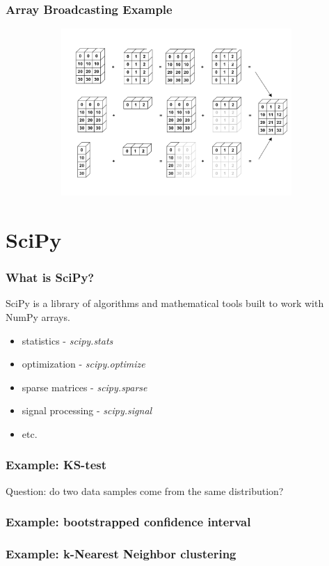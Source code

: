 \documentclass{beamer}
\begin{document}
\begin{frame}
\frametitle{Array Broadcasting Example}
\begin{figure}
    \centering
	\begin{subfigure}[b]{\textwidth}
	\centering
	\includegraphics[height=2.5in]{broadcasting}
	\label{fig:xkcd}
	\end{subfigure}
\end{figure}
\end{frame}



\section{SciPy}

\begin{frame}
\frametitle{What is SciPy?}
SciPy is a library of algorithms and mathematical tools built to work with NumPy arrays.
\vspace{0.2in}
\begin{itemize}
\setlength{\itemsep}{0.1in}
\item{statistics - \textit{scipy.stats}}
\item{optimization - \textit{scipy.optimize}}
\item{sparse matrices - \textit{scipy.sparse}}
\item{signal processing - \textit{scipy.signal}}
\item{etc.}
\end{itemize}
\end{frame}


\begin{frame}
\frametitle{Example: KS-test}
Question: do two data samples come from the same distribution?
\lstset{basicstyle=\scriptsize}
\end{frame}

\begin{frame}
\lstset{basicstyle=\scriptsize}
\frametitle{Example: bootstrapped confidence interval}
\end{frame}

\begin{frame}
\frametitle{Example: k-Nearest Neighbor clustering}
\end{frame}
\end{document}
